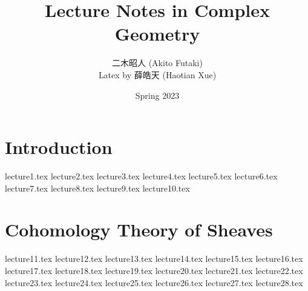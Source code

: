 \documentclass[twoside,12pt]{book}
\title{\Huge Lecture Notes in Complex Geometry}
\author{{\Large 二木昭人} (Akito Futaki)\\
Latex by 薛皓天 (Haotian Xue)}
\date{\Large Spring 2023}
\begin{document}
\maketitle
\frontmatter
\tableofcontents
\newpage
\mainmatter{}

\chapter{Introduction}
{lecture1.tex}
{lecture2.tex}
{lecture3.tex}
{lecture4.tex}
{lecture5.tex}
{lecture6.tex}
{lecture7.tex}
{lecture8.tex}
{lecture9.tex}
{lecture10.tex}
\chapter{Cohomology Theory of Sheaves}
{lecture11.tex}
{lecture12.tex}
{lecture13.tex}
{lecture14.tex}
{lecture15.tex}
{lecture16.tex}
{lecture17.tex}
{lecture18.tex}
{lecture19.tex}
{lecture20.tex}
{lecture21.tex}
{lecture22.tex}
{lecture23.tex}
{lecture24.tex}
{lecture25.tex}
{lecture26.tex}
{lecture27.tex}
{lecture28.tex}
\end{document}
